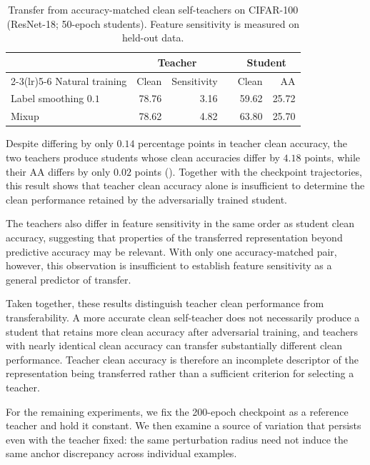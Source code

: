 \documentclass{article} %
\theoremstyle{plain}
\begin{document}
\begin{table}[!htbp]
  \centering
  \small
  \setlength{\tabcolsep}{4.5pt}
  \caption{
  Transfer from accuracy-matched clean self-teachers on CIFAR-100
  (ResNet-18; 50-epoch students).
  Feature sensitivity is measured on held-out data.
  }
  \label{tab:matchedteacher}
  \begin{tabular}{lrrcrr}
    \toprule
    & \multicolumn{2}{c}{Teacher} && \multicolumn{2}{c}{Student} \\
    \cmidrule(lr){2-3}\cmidrule(lr){5-6}
    Natural training & Clean & Sensitivity && Clean & AA \\
    \midrule
    Label smoothing \(0.1\) & 78.76 & 3.16 && 59.62 & 25.72 \\
    Mixup                 & 78.62 & 4.82 && 63.80 & 25.70 \\
    \bottomrule
  \end{tabular}
\end{table}


Despite differing by only \(0.14\) percentage points in teacher clean
accuracy, the two teachers produce students whose clean accuracies differ by
\(4.18\) points, while their AA differs by only \(0.02\) points
().
Together with the checkpoint trajectories, this result shows that teacher
clean accuracy alone is insufficient to determine the clean performance
retained by the adversarially trained student.

The teachers also differ in feature sensitivity in the same order as student
clean accuracy, suggesting that properties of the transferred representation
beyond predictive accuracy may be relevant.
With only one accuracy-matched pair, however, this observation is insufficient
to establish feature sensitivity as a general predictor of transfer.

Taken together, these results distinguish teacher clean performance from
transferability.
A more accurate clean self-teacher does not necessarily produce a student
that retains more clean accuracy after adversarial training, and teachers
with nearly identical clean accuracy can transfer substantially different
clean performance.
Teacher clean accuracy is therefore an incomplete descriptor of the
representation being transferred rather than a sufficient criterion for
selecting a teacher.

For the remaining experiments, we fix the 200-epoch checkpoint as a reference
teacher and hold it constant.
We then examine a source of variation that persists even with the teacher
fixed: the same perturbation radius need not induce the same anchor discrepancy
across individual examples.
\end{document}
